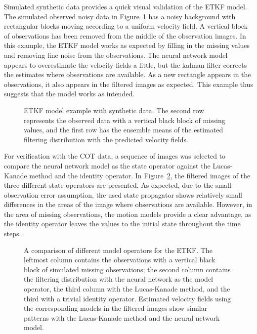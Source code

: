 Simulated synthetic data provides a quick visual validation of the ETKF model.
The simulated observed noisy data in Figure~\ref{fig:etkfexamplesynthetic} has a noisy background with rectangular blocks moving according to a uniform velocity field.
A vertical block of observations has been removed from the middle of the observation images.
In this example, the ETKF model works as expected by filling in the missing values and removing fine noise from the observations.
The neural network model appears to overestimate the velocity fields a little, but the kalman filter corrects the estimates where observations are available.
As a new rectangle appears in the observations, it also appears in the filtered images as expected.
This example thus suggests that the model works as intended.

\begin{figure}[H]
    \caption{\label{fig:etkfexamplesynthetic}ETKF model example with synthetic data.
    The second row represents the observed data with a vertical black block of missing values, and the first row has the ensemble means of the estimated filtering distribution with the predicted velocity fields.}
\end{figure}

For verification with the COT data, a sequence of images was selected to compare the neural network model as the state operator against the Lucas-Kanade method and the identity operator.
In Figure~\ref{fig:etkfexamplecot}, the filtered images of the three different state operators are presented.
As expected, due to the small observation error assumption, the used state propagator shows relatively small differences in the areas of the image where observations are available.
However, in the area of missing observations, the motion models provide a clear advantage, as the identity operator leaves the values to the initial state throughout the time steps.

\begin{figure}[h]
    \caption{\label{fig:etkfexamplecot}A comparison of different model operators for the ETKF\@.
        The leftmost column contains the observations with a vertical black block of simulated missing observations; the second column contains the filtering distribution with the neural network as the model operator, the third column with the Lucas-Kanade method, and the third with a trivial identity operator.
    Estimated velocity fields using the corresponding models in the filtered images show similar patterns with the Lucas-Kanade method and the neural network model.}
\end{figure}

